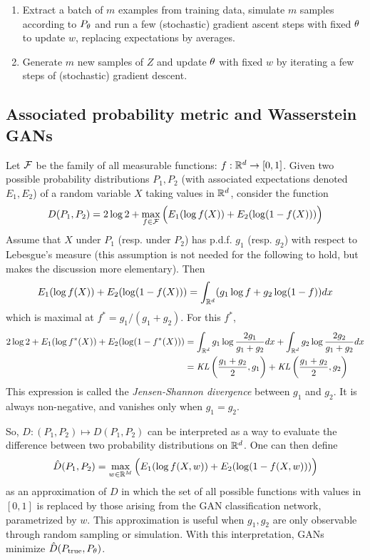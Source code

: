 \begin{algorithm}
\label{alg:gan}
\begin{enumerate}[label = \arabic*., wide=0.5cm]
\item Extract a batch of $m$ examples from training data, simulate $m$ samples according to $P_\theta$ and run a few (stochastic) gradient ascent steps with fixed $\theta$ to update $w$, replacing expectations by averages.
\item Generate $m$ new samples of $Z$ and update $\theta$ with fixed $w$ by iterating a few steps of (stochastic) gradient descent.
\end{enumerate}
\end{algorithm}
\bigskip

\subsection{Associated probability metric and Wasserstein GANs}
Let ${\mathcal F}$ be the family of all measurable functions: $f: {\mathbb{R}}^d\to [0,1]$.
Given two possible probability distributions $P_1, P_2$ (with associated expectations denoted $E_1, E_2$) of a random variable $X$ taking values in ${\mathbb{R}}^d$, consider the function
\[
D(P_1, P_2) = 2\log 2 + \max_{f\in{\mathcal F}} \Big(E_1(\log f(X)) + E_2(\log(1-f(X)))\Big)
\]
 Assume that $X$ under $P_1$ (resp.  under $P_2$) has p.d.f. $g_1$ (resp. $g_2$) with respect to Lebesgue's measure (this  assumption is not needed for the following to hold, but makes the discussion more elementary).
 Then
\[
E_1(\log f(X)) + E_2(\log(1-f(X))) = \int_{{\mathbb{R}}^d} (g_1\log f + g_2\log(1-f)) dx
\]
which is maximal at $f^* = g_1/(g_1+g_2)$.
 For this $f^*$, 
\[
\begin{aligned}
2\log 2 + E_1(\log f^*(X)) + E_2(\log(1-f^*(X))) 
&= \int_{{\mathbb{R}}^d} g_1 \log \frac{2g_1}{g_1+g_2} dx + \int_{{\mathbb{R}}^d} g_2 \log \frac{2g_2}{g_1+g_2} dx\\
&= \mathit{KL}\left(\frac{g_1+g_2}2, g_1\right) + \mathit{KL}\left(\frac{g_1+g_2}2, g_2\right)
\end{aligned}
\]
 This expression is called the {\em Jensen-Shannon divergence} between $g_1$ and $g_2$. It is always non-negative, and vanishes only when $g_1=g_2$.

 So, $D: (P_1, P_2) \mapsto D(P_1, P_2)$ can be interpreted as  a way to evaluate the difference between two probability distributions on ${\mathbb{R}}^d$.
 One can then define
\[
\hat D(P_1, P_2) = 
\max_{w\in {\mathbb{R}}^M} \Big(E_{1}(\log f(X, w)) + E_{2}(\log(1-f(X, w)))\Big)
\]
as an approximation of $D$ in which the set of all possible functions with values in $[0,1]$ is replaced by those arising from the GAN classification network, parametrized by $w$.
 This approximation is useful when $g_1, g_2$ are only observable through random sampling or simulation.
 With this interpretation, GANs minimize $\hat D(P_{\mathrm{true}}, P_\theta)$.


